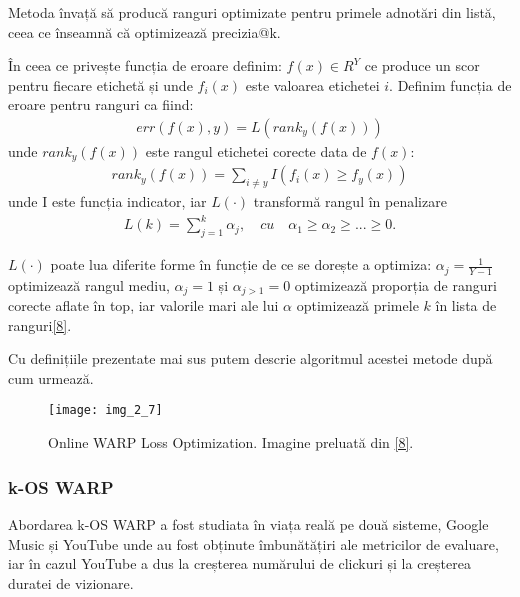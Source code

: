 Metoda învață să producă ranguri optimizate pentru primele adnotări din listă, ceea ce înseamnă că optimizează precizia@k.

În ceea ce privește funcția de eroare definim: $f(x) \in R^Y$ ce produce un scor pentru fiecare etichetă și unde $f_i(x)$ este valoarea etichetei $i$. Definim funcția de eroare pentru ranguri ca fiind:
\begin{align}
	err(f(x),y) = L(rank_y(f(x)))
\end{align}
unde $rank_y(f(x))$ este rangul etichetei corecte data de $f(x)$:
\begin{align}
	rank_y(f(x)) = \sum_{i \neq y}I(f_i(x) \geq f_y(x))
\end{align}
unde I este funcția indicator, iar $L(\cdot)$ transformă rangul în penalizare
\begin{align}
	L(k) = \sum_{j=1}^k\alpha_j, \quad cu \quad \alpha_1 \geq \alpha_2 \geq ... \geq 0.
\end{align}

$L(\cdot)$ poate lua diferite forme în funcție de ce se dorește a optimiza: $\alpha_j=\frac{1}{Y-1}$ optimizează rangul mediu, $\alpha_j=1$ și $\alpha_{j>1}=0$ optimizează proporția de ranguri corecte aflate în top, iar valorile mari ale lui $\alpha$ optimizează primele $k$ în lista de ranguri\hyperlink{JasonWestonSamyBengioNicolasUsunier}{[8]}.

Cu definițiile prezentate mai sus putem descrie algoritmul acestei metode după cum urmează.
\begin{figure}[!h]
	\centering
	\texttt{[image: img\_2\_7]}
	\caption[Online WARP Loss Optimization]{Online WARP Loss Optimization. Imagine preluată din \hyperlink{JasonWestonSamyBengioNicolasUsunier}{[8]}.}
\end{figure} 

\vspace{5mm}
\subsubsection*{k-OS WARP}
Abordarea k-OS WARP a fost studiata în viața reală pe două sisteme, Google Music și YouTube unde au fost obținute îmbunătățiri ale metricilor de evaluare, iar în cazul YouTube a dus la creșterea numărului de clickuri și la creșterea duratei de vizionare.

